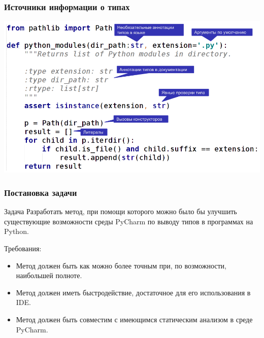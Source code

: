 \documentclass[handout]{beamer}
\begin{document}
\begin{frame}[fragile]
  \frametitle{Источники информации о типах}



  \includegraphics[width=0.9\paperwidth]{fig/type-sources-annotated.png}
    
\end{frame}

\begin{frame}
    \frametitle{Постановка задачи}
    \begin{block}{Задача}
        Разработать метод, при помощи которого можно было бы улучшить существующие
        возможности среды PyCharm по выводу типов в программах на Python.
    \end{block}

    Требования:
    \begin{itemize}
        \item Метод должен быть как можно более точным при, по возможности,
          наибольшей полноте.

        \item Метод должен иметь быстродействие, достаточное для его использования в
          IDE.

        \item Метод должен быть совместим с имеющимся статическим анализом в
          среде PyCharm.
    \end{itemize}

\end{frame}
\end{document}
